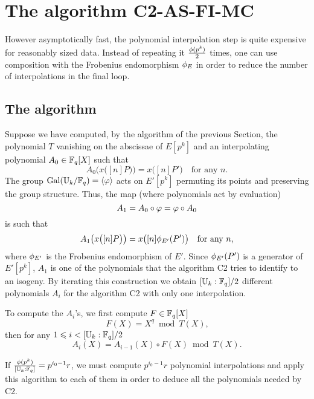 \section{The algorithm C2-AS-FI-MC}
\label{sec:C2-AS-FI-MC}

However asymptotically fast, the polynomial interpolation step is
quite expensive for reasonably sized data. Instead of repeating it
$\frac{\phi(p^k)}{2}$ times, one can use composition with the
Frobenius endomorphism $\phi_E$ in order to reduce the number of
interpolations in the final loop.

\subsection{The algorithm}
Suppose we have computed, by the algorithm of the previous Section,
the polynomial $T$ vanishing on the abscissae of $E[p^k]$ and an
interpolating polynomial $A_0\in\mathbb{F}_q[X]$ such that
\begin{equation*}
  A_0\bigl(x\bigl([n]P\bigr)\bigr) = x\bigl([n]P'\bigr)
  \quad\text{for any $n$.}
\end{equation*}
The group $\operatorname{Gal}(\mathbb{U}_k/\mathbb{F}_q) = \langle\varphi\rangle$ acts on $E'[p^k]$
permuting its points and preserving the group structure. Thus, the
map (where polynomials act by evaluation) 
\begin{equation*}
  A_1 = A_0\circ\varphi = \varphi\circ A_0
\end{equation*}
is such that
\begin{equation*}
  A_1\bigl(x\bigl([n]P\bigr)\bigr) = x\bigl([n]\phi_{E'}(P')\bigr)
  \quad\text{for any $n$,}
\end{equation*}
where $\phi_{E'}$ is the Frobenius endomorphism of $E'$.  Since
$\phi_{E'}(P')$ is a generator of $E'[p^k]$, $A_1$ is one of the
polynomials that the algorithm C2 tries to identify to an isogeny. By
iterating this construction we obtain $[\mathbb{U}_k:\mathbb{F}_q]/2$ different
polynomials $A_i$ for the algorithm C2 with only one interpolation.

To compute the $A_i$'s, we first compute $F\in\mathbb{F}_q[X]$
\begin{equation}
  \label{eq:frob}
  F(X) = X^q \bmod T(X)
  \text{,}
\end{equation}
then for any $1\leqslant i<[\mathbb{U}_k:\mathbb{F}_q]/2$
\begin{equation}
  \label{eq:modcomp}
  A_i(X) = A_{i-1}(X)\circ F(X) \bmod T(X)\text{.}
\end{equation}

If $\frac{\phi(p^k)}{[\mathbb{U}_k:\mathbb{F}_q]} = p^{i_0-1}r$, we must compute
$p^{i_0-1}r$ polynomial interpolations and apply this algorithm to
each of them in order to deduce all the polynomials needed by C2.


